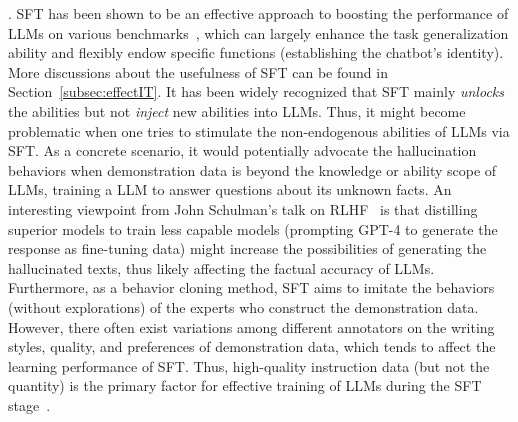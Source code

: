 {.  
SFT has been shown to be an effective approach to  boosting the performance of LLMs on various  benchmarks~\cite{Wei-ICLR-2022-Finetuned,Chung-arxiv-2022-Scaling,alpaca,vicuna2023}, which can largely enhance the task generalization ability  and  flexibly endow specific functions (\eg establishing the chatbot's identity). 
More discussions about the usefulness of SFT can be found in Section~\ref{subsec:effectIT}.  
It has been  widely recognized  that SFT mainly \emph{unlocks} the abilities but not \emph{inject} new abilities into LLMs.   
Thus, it might become problematic when one tries to stimulate the non-endogenous abilities of LLMs via SFT.  %
As a concrete scenario, it would potentially advocate the  hallucination behaviors when demonstration data is beyond the knowledge or ability scope of LLMs, \eg training a LLM to answer questions about its unknown facts.   
An interesting viewpoint from John Schulman's talk on RLHF~\cite{John-youtube-2023-RLHF} is that distilling superior models to train less capable models (\eg prompting GPT-4 to generate the response as fine-tuning data) might increase the possibilities of generating the hallucinated texts, thus likely affecting the factual accuracy of LLMs. 
Furthermore, as a behavior cloning method, SFT aims to imitate the behaviors (without explorations) of the experts who construct the demonstration data. 
However, there often exist variations among different annotators on the writing styles, quality, and preferences of demonstration data, which tends to affect the learning performance of SFT. 
Thus, high-quality instruction data (but not the quantity) is the primary factor for effective training of LLMs during the SFT stage~\cite{Touvron-2023-llama2-arxiv}.  %

}
